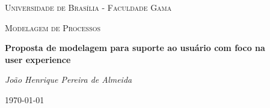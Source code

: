 \documentclass[11pt,a4paper]{article}
\begin{document}
\begin{titlepage}
	\centering
	{\scshape\LARGE Universidade de Brasília - Faculdade Gama\par}
	\vspace{1cm}
	{\scshape\Large Modelagem de Processos\par}
	\vspace{1.5cm}
	{\huge\bfseries Proposta de modelagem para suporte ao usuário com foco na \\ user experience\par}
	\vspace{2cm}
	{\Large\itshape João Henrique Pereira de Almeida\par}
	\vfill

	\vfill

	{\large \today\par}
\end{titlepage}


\tableofcontents
\listoffigures
\listoftables

\clearpage












\clearpage
\appendix
\begin{appendices}


\clearpage

\end{appendices}
\end{document}
